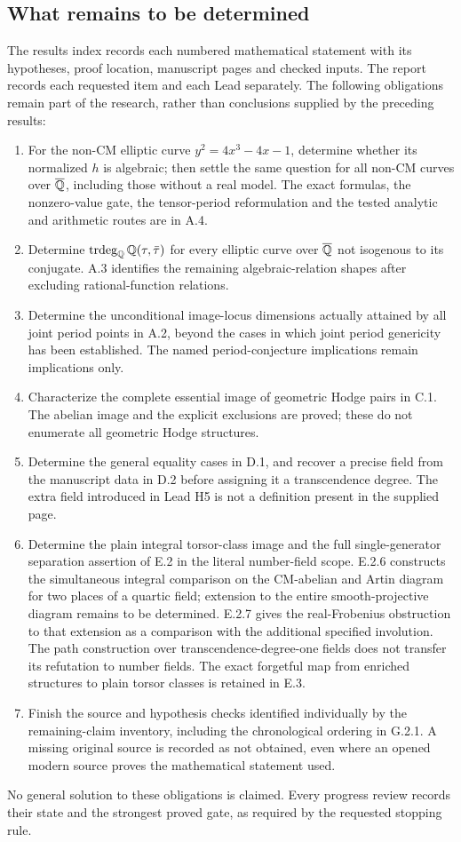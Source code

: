 



\subsection{What remains to be determined}

The results index records each numbered mathematical statement with its hypotheses, proof location, manuscript pages and checked inputs. The report records each requested item and each Lead separately. The following obligations remain part of the research, rather than conclusions supplied by the preceding results:
\begin{enumerate}[leftmargin=*]
\item For the non-CM elliptic curve $y^2=4x^3-4x-1$, determine whether its normalized $h$ is algebraic; then settle the same question for all non-CM curves over $\overline{\mathbb Q}$, including those without a real model. The exact formulas, the nonzero-value gate, the tensor-period reformulation and the tested analytic and arithmetic routes are in A.4.
\item Determine $\operatorname{trdeg}_\mathbb Q\mathbb Q(\tau,\bar\tau)$ for every elliptic curve over $\overline{\mathbb Q}$ not isogenous to its conjugate. A.3 identifies the remaining algebraic-relation shapes after excluding rational-function relations.
\item Determine the unconditional image-locus dimensions actually attained by all joint period points in A.2, beyond the cases in which joint period genericity has been established. The named period-conjecture implications remain implications only.
\item Characterize the complete essential image of geometric Hodge pairs in C.1. The abelian image and the explicit exclusions are proved; these do not enumerate all geometric Hodge structures.
\item Determine the general equality cases in D.1, and recover a precise field from the manuscript data in D.2 before assigning it a transcendence degree. The extra field introduced in Lead H5 is not a definition present in the supplied page.
\item Determine the plain integral torsor-class image and the full single-generator separation assertion of E.2 in the literal number-field scope. E.2.6 constructs the simultaneous integral comparison on the CM-abelian and Artin diagram for two places of a quartic field; extension to the entire smooth-projective diagram remains to be determined. E.2.7 gives the real-Frobenius obstruction to that extension as a comparison with the additional specified involution. The path construction over transcendence-degree-one fields does not transfer its refutation to number fields. The exact forgetful map from enriched structures to plain torsor classes is retained in E.3.
\item Finish the source and hypothesis checks identified individually by the remaining-claim inventory, including the chronological ordering in G.2.1. A missing original source is recorded as not obtained, even where an opened modern source proves the mathematical statement used.
\end{enumerate}

No general solution to these obligations is claimed. Every progress review records their state and the strongest proved gate, as required by the requested stopping rule.

